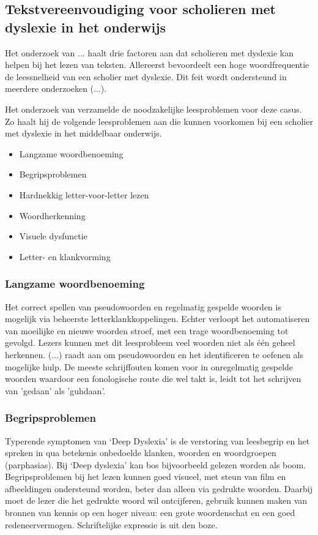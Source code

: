 \subsection{Tekstvereenvoudiging voor scholieren met dyslexie in het onderwijs}

Het onderzoek van ... haalt drie factoren aan dat scholieren met dyslexie kan helpen bij het lezen van teksten. Allereerst bevoordeelt een hoge woordfrequentie de leessnelheid van een scholier met dyslexie. Dit feit wordt ondersteund in meerdere onderzoeken (...). 


Het onderzoek van \textcite{Filipak2020} verzamelde de noodzakelijke leesproblemen voor deze casus. Zo haalt hij de volgende leesproblemen aan die kunnen voorkomen bij een scholier met dyslexie in het middelbaar onderwijs.

\begin{itemize}
	\item Langzame woordbenoeming
	\item Begripsproblemen
	\item Hardnekkig letter-voor-letter lezen
	\item Woordherkenning
	\item Visuele dysfunctie
	\item Letter- en klankvorming
\end{itemize}

\subsubsection{Langzame woordbenoeming}

Het correct spellen van pseudowoorden en regelmatig gespelde woorden is mogelijk via beheerste letterklankkoppelingen. Echter verloopt het automatiseren van moeilijke en nieuwe woorden stroef, met een trage woordbenoeming tot gevolgd. Lezers kunnen met dit leesprobleem veel woorden niet als één geheel herkennen. (...) raadt aan om pseudowoorden en het identificeren te oefenen als mogelijke hulp. De meeste schrijffouten komen voor in onregelmatig gespelde woorden waardoor een fonologische route die wel takt is, leidt tot het schrijven van 'gedaan' als 'guhdaan'.


\subsubsection{Begripsproblemen}

Typerende symptomen van ‘Deep Dyslexia’ is de verstoring van leesbegrip en het spreken in qua betekenis onbedoelde klanken, woorden en woordgroepen (parphasias). Bij ‘Deep dyslexia’ kan bos bijvoorbeeld gelezen worden als boom. Begripsproblemen bij het lezen kunnen goed visueel, met steun van film en afbeeldingen ondersteund worden, beter dan alleen via gedrukte woorden. Daarbij moet de lezer die het gedrukte woord wil ontcijferen, gebruik kunnen maken van bronnen van kennis op een hoger niveau: een grote woordenschat en een goed redeneervermogen. Schriftelijke expressie is uit den boze.

